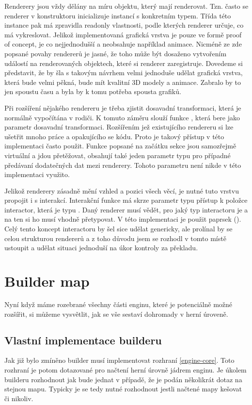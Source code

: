 Renderery jsou vždy dělány na míru objektu, který mají renderovat. Tzn. často se renderer v konstruktoru 
inicializuje instancí s konkretním typem. Třída této instance pak má zpravidla readonly vlastnosti,
podle kterých renderer určuje, co má vykreslovat. Jelikož implementovaná grafická vrstva je pouze ve formě proof of concept,
je co nejjednodušší a neobsahuje například animace. Nicméně ze zde popsané povahy rendererů je jasné, že 
toho může být dosaženo vytvořením událostí na renderovaných objektech, které si renderer zaregistruje.
Dovedeme si představit, že by šla s takovým návrhem velmi jednoduše udělat grafická vrstva, která bude
velmi pěkná, bude mít kvalitní 3D modely a animace. Zabralo by to jen spoustu času a byla by k tomu potřeba spousta grafiků.

Při rozšíření nějakého rendereru je třeba zjistit dosavadní transformaci, která je normálně vypočítána v rodiči.
K tomuto záměru slouží funkce , která bere jako parametr dosavadní transformaci.
Rozšířením jež existujícího rendereru si lze ušetřit mnoho práce a opakujícího se kódu. Proto je takový přístup v této implementaci často použit.
Funkce popsané na začátku sekce jsou samozřejmě virtuální a jdou přetěžovat,
obsahují také jeden parametr typu  pro případné předávaní dodatečných dat mezi renderery. Tohoto parametru není nikde v této implementaci využito.

Jelikož renderery zásadně mění vzhled a pozici všech věcí, je nutné tuto vrstvu propojit i s interakcí.
Interakční funkce má skrze parametr typu   přístup k položce interactor, která je typu .
Daný renderer musí vědět, pro jaký typ interactoru je a na ten si ho musí vhodně přetypovat. V této implementaci je použit paprsek (). 
Celý tento koncept interactoru by šel sice udělat genericky, ale prolínal by se celou strukturou rendererů a z toho
důvodu jsem se rozhodl v tomto místě ustoupit a udělat situaci jednoduší na úkor kontroly za překladu.

\section{Builder map}
Nyní když máme rozebrané všechny části enginu, které je potenciálně možné rozšířit, si můžeme vysvětlit, jak
se vše sestaví dohromady v herní úroveně.

\subsection{Vlastní implementace builderu}
Jak již bylo zmíněno builder musí implementovat rozhraní \vref{engine-core}. Toto rozhraní je
potom dotazované pro načtení herní úrovně jádrem enginu. Je úkolem builderu rozhodnout jak bude jednat
v případě, že je podán několikrát dotaz na stejnou mapu. Typicky je se tedy nutné rozhodnout
jestli načtené mapy kešovat či nikoliv. 

